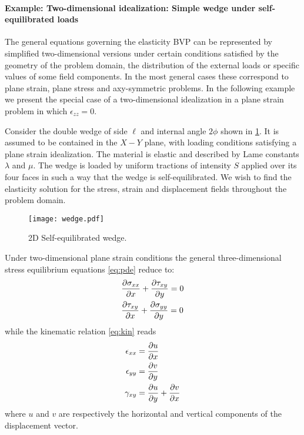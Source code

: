 \paragraph*{Example: Two-dimensional idealization: Simple wedge under self-equilibrated loads}

The general equations governing the elasticity BVP can be represented by simplified two-dimensional versions under certain conditions satisfied by the geometry of the problem domain, the distribution of the external loads or specific values of some field components. In the most general cases these correspond to plane strain, plane stress and axy-symmetric problems. In the following example we present the special case of a two-dimensional idealization in a plane strain problem in which $\epsilon_{zz}=0$. 

Consider the double wedge of side $\ell$ and internal angle $2 \phi$ shown in \cref{fig:WEDGE}. It is assumed to be contained in the $X-Y$ plane, with loading conditions satisfying a plane strain idealization. The material is elastic and described by Lame constants $\lambda$ and $\mu$. The wedge is loaded by uniform tractions of intensity $S$ applied over its four faces in such a way that the wedge is self-equilibrated. We wish to find the elasticity solution for the stress, strain and displacement fields throughout the problem domain.
\begin{figure}[h]
\centering
\texttt{[image: wedge.pdf]}
\caption{2D Self-equilibrated wedge.}
\label{fig:WEDGE}
\end{figure}





Under two-dimensional plane strain conditions the general three-dimensional stress equilibrium equations \ref{eq:pde} reduce to:
\begin{equation}
\begin{aligned}
&\pdv{\sigma_{xx}}{x} + \pdv{\tau_{xy}}{y}=0\\
&\pdv{\tau_{xy}}{x} + \pdv{\sigma_{yy}}{y}=0
\end{aligned}
\label{eq:equilibrium}
\end{equation}
while the kinematic relation \ref{eq:kin} reads
\begin{equation}
\begin{aligned}
\epsilon_{xx}& = \pdv{u}{x}\\
\epsilon_{yy}& = \pdv{v}{y}\\
\gamma_{xy}& = \pdv{u}{y} + \pdv{v}{x}
\end{aligned}
\label{eq:strain}
\end{equation}
where $u$ and $v$ are respectively the horizontal and vertical components of the displacement vector.

